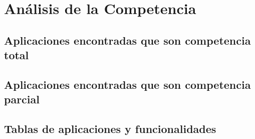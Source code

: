 \chapter{Análisis de la Competencia}
\section{Aplicaciones encontradas que son competencia total}
\section{Aplicaciones encontradas que son competencia parcial}
\section{Tablas de aplicaciones y funcionalidades}